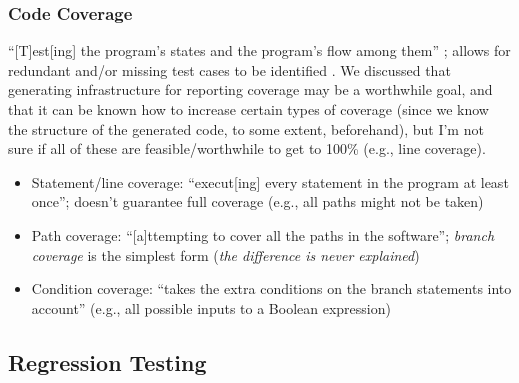 \subsubsection{Code Coverage \cite[p.~117-121]{patton_software_2006}}

``[T]est[ing] the program's states and the program's flow among them''
\cite[p.~117]{patton_software_2006}; allows for redundant and/or missing test
cases to be identified \cite[p.~118]{patton_software_2006}. We discussed that
generating infrastructure for reporting coverage may be a worthwhile goal, and
that it can be known how to increase certain types of coverage (since we know
the structure of the generated code, to some extent, beforehand), but I'm
not sure if all of these are feasible/worthwhile to get to 100\% (e.g., line
coverage).

\begin{itemize}
      \item Statement/line coverage: ``execut[ing] every statement in the
            program at least once''; doesn't guarantee full coverage
            (e.g., all paths might not be taken) \cite[p.~119]{patton_software_2006}
      \item Path coverage: ``[a]ttempting to cover all the paths in the
            software''; \emph{branch coverage} is the simplest form (\emph{the
                  difference is never explained}) \cite[p.~119]{patton_software_2006}
      \item Condition coverage: ``takes the extra conditions on the branch
            statements into account'' (e.g., all possible inputs to a Boolean
            expression) \cite[p.~120]{patton_software_2006}
\end{itemize}

\subsection{Regression Testing}

